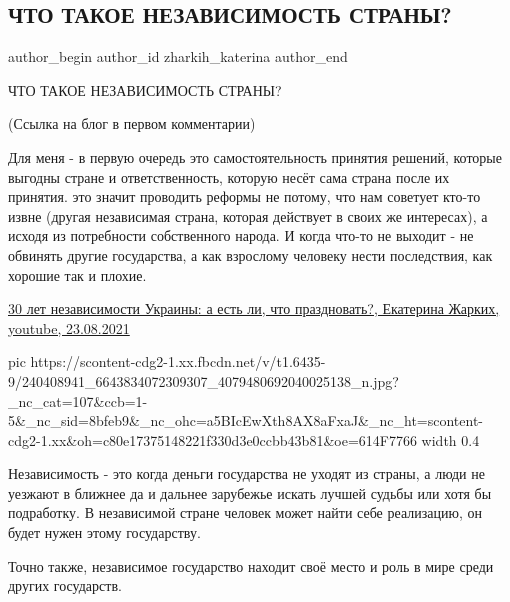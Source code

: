  
 
 
 
 
 
\subsection{ЧТО ТАКОЕ НЕЗАВИСИМОСТЬ СТРАНЫ?}
\label{sec:24_08_2021.fb.zharkih_katerina.1.chto_takoje_nezavisimost}
 
\ifcmt
 author_begin
   author_id zharkih_katerina
 author_end
\fi

ЧТО ТАКОЕ НЕЗАВИСИМОСТЬ СТРАНЫ? 

(Ссылка на блог в первом комментарии)

Для меня - в первую очередь это самостоятельность принятия решений, которые
выгодны стране и ответственность, которую несёт сама страна после их принятия.
это значит проводить реформы не потому, что нам советует кто-то извне (другая
независимая страна, которая действует в своих же интересах), а исходя из
потребности собственного народа. И когда что-то не выходит - не обвинять другие
государства, а как взрослому человеку нести последствия, как хорошие так и
плохие. 

\href{https://www.youtube.com/watch?v=Ec6Ops5Y57Y}{%
30 лет независимости Украины: а есть ли, что праздновать?, Екатерина Жарких, %
youtube, 23.08.2021%
}

\ifcmt
  pic https://scontent-cdg2-1.xx.fbcdn.net/v/t1.6435-9/240408941_6643834072309307_4079480692040025138_n.jpg?_nc_cat=107&ccb=1-5&_nc_sid=8bfeb9&_nc_ohc=a5BIcEwXth8AX8aFxaJ&_nc_ht=scontent-cdg2-1.xx&oh=c80e17375148221f330d3e0ccbb43b81&oe=614F7766
  width 0.4
\fi

Независимость - это когда деньги государства не уходят из страны, а люди не
уезжают в ближнее да и дальнее зарубежье искать лучшей судьбы или хотя бы
подработку. В независимой стране человек может найти себе реализацию, он будет
нужен этому государству.   

Точно также, независимое государство находит своё место и роль в мире среди
других государств. 

